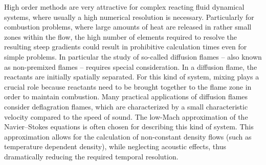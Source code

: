 High order methods are very attractive for complex reacting fluid dynamical systems, where usually a high numerical resolution is necessary. Particularly for combustion problems, where large amounts of heat are released in rather small zones within the flow, the high number of elements required to resolve the resulting steep gradients could result in prohibitive calculation times even for simple problems. In particular the study of so-called diffusion flames -- also known as non-premixed flames -- requires special consideration. In a diffusion flame, the reactants are initially spatially separated. For this kind of system, mixing plays a crucial role because reactants need to be brought together to the flame zone in order to maintain combustion. Many practical applications of diffusion flames consider deflagration flames, \textcite{poinsotTheoreticalNumericalCombustion2005} which are characterized by a small characteristic velocity compared to the speed of sound. The low-Mach approximation of the Navier--Stokes equations is often chosen for describing this kind of system. This approximation allows for the calculation of non-constant density flows (such as temperature dependent density), while neglecting acoustic effects, thus dramatically reducing the required temporal resolution. \textcite{mullerLowMachNumberAsymptoticsNavierStokes1998}

